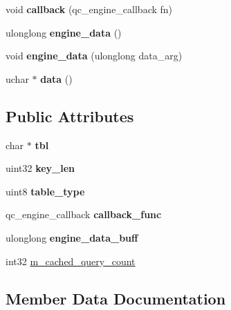 \begin{DoxyCompactItemize}
void {\bfseries callback} (qc\+\_\+engine\+\_\+callback fn)
\item 
\mbox{\label{structQuery__cache__table_a3b7e2132c4f873f0d722a607dd943b03}} 
ulonglong {\bfseries engine\+\_\+data} ()
\item 
\mbox{\label{structQuery__cache__table_a7ae8d8cdc6df62d8772f72703e497aa8}} 
void {\bfseries engine\+\_\+data} (ulonglong data\+\_\+arg)
\item 
\mbox{\label{structQuery__cache__table_a58e11603efd47f9c8539180ca6d56bda}} 
uchar $\ast$ {\bfseries data} ()
\end{DoxyCompactItemize}
\subsection*{Public Attributes}
\begin{DoxyCompactItemize}
\item 
\mbox{\label{structQuery__cache__table_ae5dc1a8cfe0bdf9b70fb6a5408f14008}} 
char $\ast$ {\bfseries tbl}
\item 
\mbox{\label{structQuery__cache__table_a2a3d74d5aa6765659975fb6191ab395b}} 
uint32 {\bfseries key\+\_\+len}
\item 
\mbox{\label{structQuery__cache__table_acd3f2076ae71c27d93479689369fe6b9}} 
uint8 {\bfseries table\+\_\+type}
\item 
\mbox{\label{structQuery__cache__table_a2540d8f1053b1c3cb732168c9cc3afb1}} 
qc\+\_\+engine\+\_\+callback {\bfseries callback\+\_\+func}
\item 
\mbox{\label{structQuery__cache__table_a2aca6c802e03e37699d152b9339e419c}} 
ulonglong {\bfseries engine\+\_\+data\+\_\+buff}
\item 
int32 \mbox{\hyperlink{structQuery__cache__table_a5eaa4de3b46357aafcfc9685a6457061}{m\+\_\+cached\+\_\+query\+\_\+count}}
\end{DoxyCompactItemize}


\subsection{Member Data Documentation}
\mbox{\label{structQuery__cache__table_a5eaa4de3b46357aafcfc9685a6457061}} 
